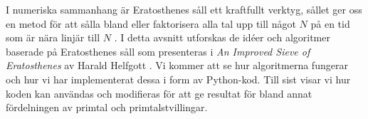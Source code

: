 

I numeriska sammanhang är Eratosthenes såll ett kraftfullt verktyg,
sållet ger oss en metod för att sålla bland eller faktorisera alla tal upp till något $N$ på en tid som är nära linjär till $N$ \cite[s. 333]{HaraldSieve}.
I detta avsnitt utforskas de idéer och algoritmer baserade på Eratosthenes såll som presenteras i \textit{An Improved Sieve of Eratosthenes} av Harald Helfgott \cite{HaraldSieve}.
Vi kommer att se hur algoritmerna fungerar och hur vi har implementerat dessa i form av Python-kod.
Till sist visar vi hur koden kan användas och modifieras för att ge resultat för bland annat fördelningen av primtal och primtalstvillingar.



